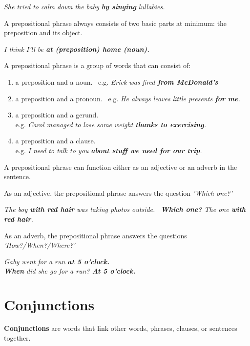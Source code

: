 \documentclass[hidelinks,10pt,a4paper]{article}
\begin{document}
\begin{center}
	\textit{She tried to calm down the baby \textbf{by singing} lullabies.}
\end{center}

A prepositional phrase always consists of two basic parts at minimum: the preposition and its object.

\begin{center}
	\textit{I think I'll be \textbf{at (preposition) home (noun).} }
\end{center}

A prepositional phrase is a group of words that can consist of:
\begin{enumerate}[label=(\alph*)]
	\item a preposition and a noun. \
		e.g. \textit{Erick was fired \textbf{from McDonald's} }
	\item a preposition and a pronoun. \
		e.g. \textit{He always leaves little presents \textbf{for me}. }
	\item a preposition and a gerund. \\
		e.g. \textit{Carol managed to lose some weight \textbf{thanks to exercising}. }
	\item a preposition and a clause. \\
		e.g. \textit{I need to talk to you \textbf{about stuff we need for our trip}. }
\end{enumerate}

A prepositional phrase can function either as an adjective or an adverb in the sentence.

As an adjective, the prepositional phrase answers the question \textit{'Which one?'}

\begin{center}
	\textit{The boy \textbf{with red hair} was taking photos outside. \
	\textbf{Which one?} The one \textbf{with red hair}.  }
\end{center}

As an adverb, the prepositional phrase answers the questions \textit{'How?/When?/Where?'}

\begin{center}
	\textit{Gaby went for a run \textbf{at 5 o'clock.}\\
	\textbf{When} did she go for a run? \textbf{At 5 o'clock.} }
\end{center}

\section{Conjunctions}
\textbf{Conjunctions} are words that link other words, phrases, clauses, or sentences together.
\end{document}
